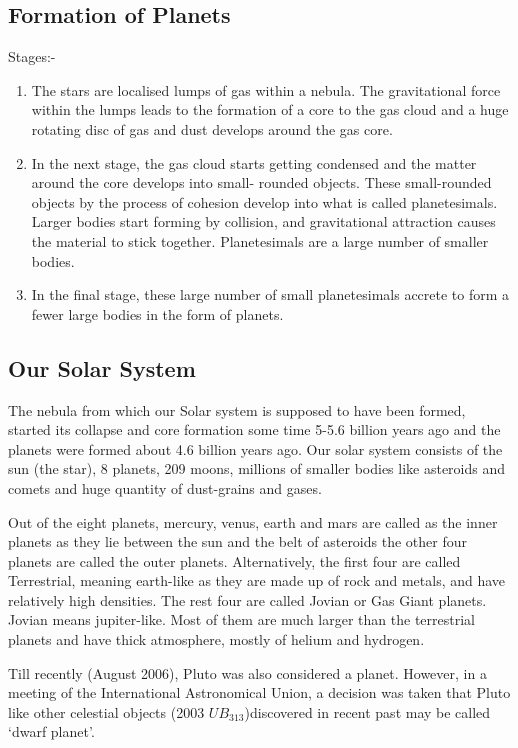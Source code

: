 \documentclass[8pt, a4paper, oneside, twocolumn]{extarticle}
\begin{document}
\subsection{Formation of Planets}
Stages:-
\begin{enumerate}
  \item The stars are localised lumps of gas within a nebula. The gravitational force within the lumps leads to the formation of a core to the gas cloud and a huge rotating disc of gas and dust develops around the gas core.
  \item In the next stage, the gas cloud starts getting condensed and the matter around the core develops into small- rounded objects. These small-rounded objects by the process of cohesion develop into what is called planetesimals. Larger bodies start forming by collision, and gravitational attraction causes the material to stick together. Planetesimals are a large number of smaller bodies.
  \item In the final stage, these large number of small planetesimals accrete to form a fewer large bodies in the form of planets.
\end{enumerate}
\subsection{Our Solar System}
The nebula from which our Solar system is supposed to have been formed, started its collapse and core formation some time 5-5.6 billion years ago and the planets were formed about 4.6 billion years ago. Our solar system consists of the sun (the star), 8 planets, 209 moons, millions of smaller bodies like asteroids and comets and huge quantity of dust-grains and gases.

Out of the eight planets, mercury, venus, earth and mars are called as the inner planets as they lie between the sun and the belt of asteroids the other four planets are called the outer planets. Alternatively, the first four are called Terrestrial, meaning earth-like as they are made up of rock and metals, and have relatively high densities. The rest four are called Jovian or Gas Giant planets. Jovian means jupiter-like. Most of them are much larger than the terrestrial planets and have thick atmosphere, mostly of helium and hydrogen.

Till recently (August 2006), Pluto was also considered a planet. However, in a meeting of the International Astronomical Union, a decision was taken that Pluto like other celestial objects (2003 $UB_{313}$)discovered in recent past may be called ‘dwarf planet’.
\end{document}
